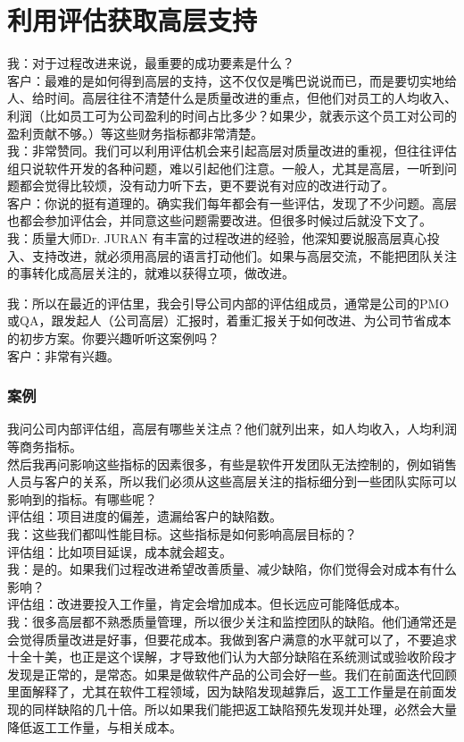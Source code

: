 \chapter{利用评估获取高层支持} %

我：对于过程改进来说，最重要的成功要素是什么？\\
客户：最难的是如何得到高层的支持，这不仅仅是嘴巴说说而已，而是要切实地给人、给时间。高层往往不清楚什么是质量改进的重点，但他们对员工的人均收入、利润（比如员工可为公司盈利的时间占比多少？如果少，就表示这个员工对公司的盈利贡献不够。）等这些财务指标都非常清楚。\\
我：非常赞同。我们可以利用评估机会来引起高层对质量改进的重视，但往往评估组只说软件开发的各种问题，难以引起他们注意。一般人，尤其是高层，一听到问题都会觉得比较烦，没有动力听下去，更不要说有对应的改进行动了。\\
客户：你说的挺有道理的。确实我们每年都会有一些评估，发现了不少问题。高层也都会参加评估会，并同意这些问题需要改进。但很多时候过后就没下文了。\\
我：质量大师Dr. JURAN
有丰富的过程改进的经验，他深知要说服高层真心投入、支持改进，就必须用高层的语言打动他们。如果与高层交流，不能把团队关注的事转化成高层关注的，就难以获得立项，做改进。

我：所以在最近的评估里，我会引导公司内部的评估组成员，通常是公司的PMO或QA，跟发起人（公司高层）汇报时，着重汇报关于如何改进、为公司节省成本的初步方案。你要兴趣听听这案例吗？\\
客户：非常有兴趣。\\
\hypertarget{ux7b2cux4e00ux7248ux65b9ux6848ux4e66}{%
\subsection{案例}\label{ux7b2cux4e00ux7248ux65b9ux6848ux4e66}}
我问公司内部评估组，高层有哪些关注点？他们就列出来，如人均收入，人均利润等商务指标。\\
然后我再问影响这些指标的因素很多，有些是软件开发团队无法控制的，例如销售人员与客户的关系，所以我们必须从这些高层关注的指标细分到一些团队实际可以影响到的指标。有哪些呢？\\
评估组：项目进度的偏差，遗漏给客户的缺陷数。\\
我：这些我们都叫性能目标。这些指标是如何影响高层目标的？\\
评估组：比如项目延误，成本就会超支。\\
我：是的。如果我们过程改进希望改善质量、减少缺陷，你们觉得会对成本有什么影响？\\
评估组：改进要投入工作量，肯定会增加成本。但长远应可能降低成本。\\
我：很多高层都不熟悉质量管理，所以很少关注和监控团队的缺陷。他们通常还是会觉得质量改进是好事，但要花成本。我做到客户满意的水平就可以了，不要追求十全十美，也正是这个误解，才导致他们认为大部分缺陷在系统测试或验收阶段才发现是正常的，是常态。如果是做软件产品的公司会好一些。我们在前面迭代回顾里面解释了，尤其在软件工程领域，因为缺陷发现越靠后，返工工作量是在前面发现的同样缺陷的几十倍。所以如果我们能把返工缺陷预先发现并处理，必然会大量降低返工工作量，与相关成本。\\

